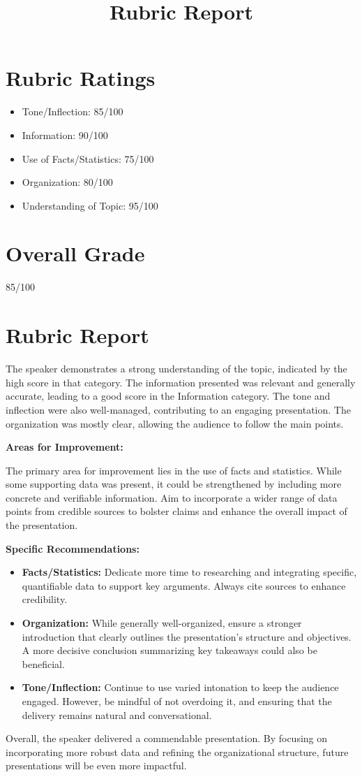 \documentclass{article}
\title{Rubric Report}
\date{}
\begin{document}
\maketitle

\section*{Rubric Ratings}

\begin{itemize}
    \item Tone/Inflection: 85/100
    \item Information: 90/100
    \item Use of Facts/Statistics: 75/100
    \item Organization: 80/100
    \item Understanding of Topic: 95/100
\end{itemize}

\section*{Overall Grade}

85/100

\section*{Rubric Report}

The speaker demonstrates a strong understanding of the topic, indicated by the high score in that category. The information presented was relevant and generally accurate, leading to a good score in the Information category. The tone and inflection were also well-managed, contributing to an engaging presentation. The organization was mostly clear, allowing the audience to follow the main points.

\textbf{Areas for Improvement:}

The primary area for improvement lies in the use of facts and statistics. While some supporting data was present, it could be strengthened by including more concrete and verifiable information. Aim to incorporate a wider range of data points from credible sources to bolster claims and enhance the overall impact of the presentation.

\textbf{Specific Recommendations:}

\begin{itemize}
    \item \textbf{Facts/Statistics:} Dedicate more time to researching and integrating specific, quantifiable data to support key arguments. Always cite sources to enhance credibility.
    \item \textbf{Organization:} While generally well-organized, ensure a stronger introduction that clearly outlines the presentation's structure and objectives. A more decisive conclusion summarizing key takeaways could also be beneficial.
    \item \textbf{Tone/Inflection:} Continue to use varied intonation to keep the audience engaged. However, be mindful of not overdoing it, and ensuring that the delivery remains natural and conversational.
\end{itemize}

Overall, the speaker delivered a commendable presentation. By focusing on incorporating more robust data and refining the organizational structure, future presentations will be even more impactful.
\end{document}
